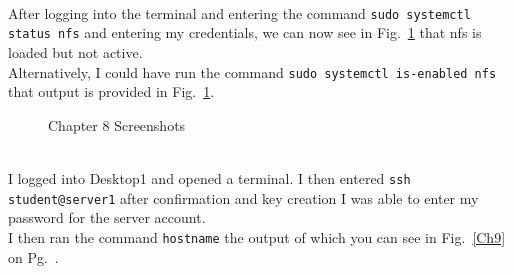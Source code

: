 \documentclass[../CIT217_RHEL124_LabJournal.tex]{subfiles}
\begin{document}
\noindent{}
\\After logging into the terminal and entering the command
{\scriptsize{\verb$sudo systemctl status nfs$}\normalsize} and 
entering my credentials, we can now see in Fig.~\ref{Ch8} that nfs is loaded but not active.
\\Alternatively, I could have run the command
{\scriptsize{\verb$sudo systemctl is-enabled nfs$}\normalsize} that output
is provided in Fig.~\ref{Ch8}.


\begin{figure}[!hbt]\centering
{}\par
{}\par
{}\par
\caption{Chapter 8 Screenshots}
\label{Ch8}
\end{figure}

\clearpage



\\I logged into Desktop1 and opened a terminal. I then entered
{\scriptsize{\verb$ssh student@server1$}\normalsize} after confirmation and key
creation I was able to enter my password for the server account.
\\I then ran the command {\scriptsize{\verb$hostname$}\normalsize} the
output of which you can see in Fig.~\ref{Ch9} on
Pg.~\pageref{Ch9}.
\hfill\break
\end{document}
